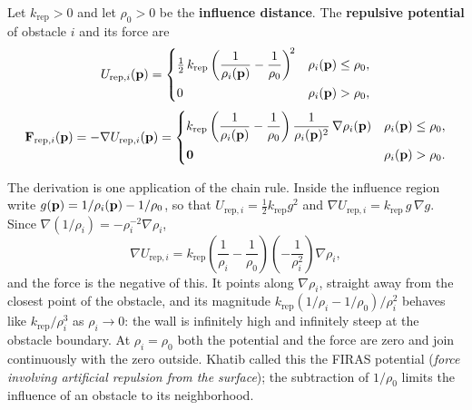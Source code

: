 \begin{definition}
\label{def:ch15-repulsive}
Let $k_{\mathrm{rep}} > 0$ and let $\rho_0 > 0$ be the
\textbf{influence distance}. The \textbf{repulsive potential} of obstacle $i$ and its force are
\begin{equation}
  U_{\mathrm{rep},i}(\mathbf{p}) =
  \begin{cases}
    \tfrac12\, k_{\mathrm{rep}} \left( \dfrac{1}{\rho_i(\mathbf{p})} - \dfrac{1}{\rho_0} \right)^{\!2}
      & \rho_i(\mathbf{p}) \le \rho_0,\\[8pt]
    0 & \rho_i(\mathbf{p}) > \rho_0,
  \end{cases}
  \label{eq:ch15-urep}
\end{equation}
\begin{equation}
  \mathbf{F}_{\mathrm{rep},i}(\mathbf{p}) = -\nabla U_{\mathrm{rep},i}(\mathbf{p}) =
  \begin{cases}
    k_{\mathrm{rep}} \left( \dfrac{1}{\rho_i(\mathbf{p})} - \dfrac{1}{\rho_0} \right)
      \dfrac{1}{\rho_i(\mathbf{p})^2}\, \nabla \rho_i(\mathbf{p})
      & \rho_i(\mathbf{p}) \le \rho_0,\\[8pt]
    \mathbf{0} & \rho_i(\mathbf{p}) > \rho_0.
  \end{cases}
  \label{eq:ch15-frep}
\end{equation}
\end{definition}

The derivation is one application of the chain rule. Inside the influence
region write $g(\mathbf{p}) = 1/\rho_i(\mathbf{p}) - 1/\rho_0$, so that $U_{\mathrm{rep},i}
= \tfrac12 k_{\mathrm{rep}} g^2$ and $\nabla U_{\mathrm{rep},i} =
k_{\mathrm{rep}}\, g\, \nabla g$. Since $\nabla (1/\rho_i) = -\rho_i^{-2}
\nabla \rho_i$,
\[
  \nabla U_{\mathrm{rep},i}
  = k_{\mathrm{rep}} \left( \frac{1}{\rho_i} - \frac{1}{\rho_0} \right)
    \left( -\frac{1}{\rho_i^2} \right) \nabla \rho_i,
\]
and the force is the negative of this. It points along $\nabla\rho_i$,
straight away from the closest point of the obstacle, and its magnitude
$k_{\mathrm{rep}} (1/\rho_i - 1/\rho_0)/\rho_i^2$ behaves like
$k_{\mathrm{rep}}/\rho_i^3$ as $\rho_i \to 0$: the wall is infinitely high
and infinitely steep at the obstacle boundary. At $\rho_i = \rho_0$ both the
potential and the force are zero and join continuously with the zero
outside. Khatib called this the FIRAS potential (\emph{force involving
artificial repulsion from the surface}); the subtraction of $1/\rho_0$
limits the influence of an obstacle to its neighborhood.

